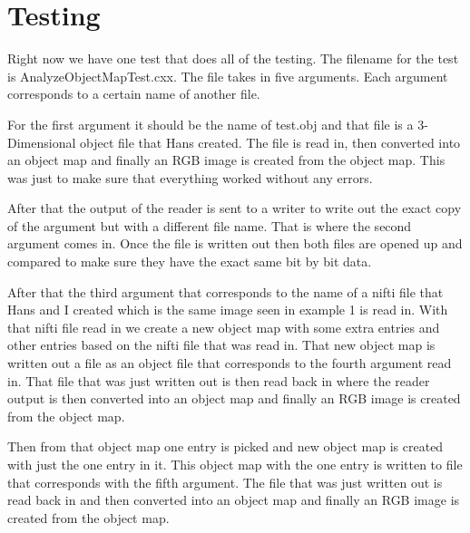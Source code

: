 \documentclass{InsightArticle}
\begin{document}
\section{Testing}

Right now we have one test that does all of the testing.  The filename for the test is AnalyzeObjectMapTest.cxx.  The file takes in five arguments.
Each argument corresponds to a certain name of another file.  

For the first argument it should be the name of test.obj and that file is a 3-Dimensional object file that Hans created.  The file is read in, then converted into an object map and finally an RGB image is created from the object map.  This was just to make sure that everything worked without any errors.  

After that the output of the reader is sent to a writer to write out the exact copy of the argument but with a different file name.  That is where the second argument comes in.  Once the file is written out then both files are opened up and compared to make sure they have the exact same bit by bit data.  

After that the third argument that corresponds to the name of a nifti file that Hans and I created which is the same image seen in example 1 is read in.  With that nifti file read in we create a new object map with some extra entries and other entries based on the nifti file that was read in.  That new object map is written out a file as an object file that corresponds to the fourth argument read in.  That file that was just written out is then read back in where the reader output is then converted into an object map and finally an RGB image is created from the object map.  

Then from that object map one entry is picked and new object map is created with just the one entry in it.  This object map with the one entry is written to file that corresponds with the fifth argument.  The file that was just written out is read back in and then converted into an object map and finally an RGB image is created from the object map.



%
%



\end{document}
